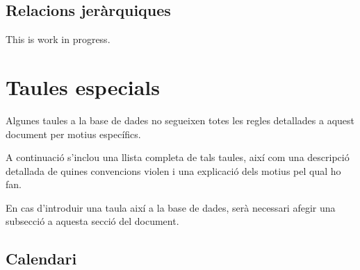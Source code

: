 \documentclass{article}
\theoremstyle{definition}
\begin{document}
\subsection{Relacions jeràrquiques}\label{section:normalization:hierarchical}
This is work in progress.

\section{Taules especials}
Algunes taules a la base de dades no segueixen totes les regles detallades a aquest document per motius específics.

A continuació s'inclou una llista completa de tals taules, així com una descripció detallada de quines convencions violen i una explicació dels motius pel qual ho fan.

En cas d'introduir una taula així a la base de dades, serà necessari afegir una subsecció a aquesta secció del document.

\subsection{Calendari}\label{section:special:calendar}
\end{document}
